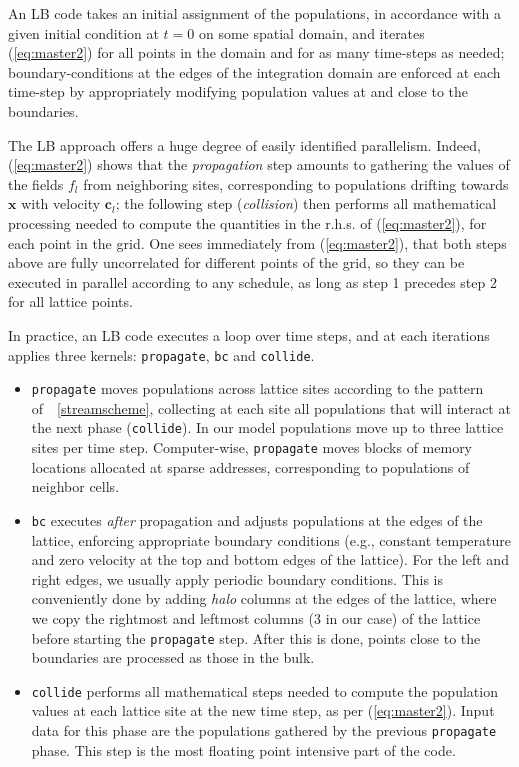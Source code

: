 \documentclass[times]{cpeauth}
\begin{document}
An LB code takes an initial assignment of the populations, in accordance
with a given initial condition at $t = 0$ on some spatial domain, and iterates
(\ref{eq:master2}) for all points in the domain and for as many time-steps
as needed; boundary-conditions at the edges of the integration
domain are enforced at each time-step by appropriately modifying population 
values at and close to the boundaries.

The LB approach offers a huge degree of easily identified parallelism. Indeed,
(\ref{eq:master2}) shows that the {\em propagation} step amounts
to gathering the values of the fields $f_l$ from neighboring sites,
corresponding to populations drifting towards ${\bm x}$ with velocity 
${\bm c}_l$; the following step ({\em collision}) then performs all mathematical
processing needed to compute the quantities in the r.h.s. of 
(\ref{eq:master2}), for each point in the grid. One sees immediately from 
(\ref{eq:master2}), that both steps above are fully
uncorrelated for different points of the grid, so they can be executed in 
parallel according to any schedule, as long as step 1 precedes step 2
for all lattice points.

In practice, an LB code executes a loop over time steps, and at each 
iterations applies three kernels: {\tt propagate}, {\tt bc} and {\tt collide}.

\begin{itemize}
\item
{\tt propagate} moves populations across lattice sites according to the
pattern of~\figurename~\ref{streamscheme}, collecting at each site
all populations that will interact at the next phase ({\tt collide}).
In our model populations move up to three lattice sites per time step.
Computer-wise, {\tt propagate} moves blocks of  memory locations allocated
at sparse addresses, corresponding to populations of neighbor cells. 

\item 
{\tt bc} executes {\em after} propagation and adjusts populations at the
edges of the lattice, enforcing appropriate boundary conditions 
(e.g., constant temperature and zero velocity at 
the top and bottom edges of the lattice).
For the left and right edges, we usually apply periodic 
boundary conditions. 
This is conveniently done by adding {\em halo} columns at the
edges of the lattice, where we copy the rightmost and leftmost 
columns (3 in our case) of the lattice before starting
the {\tt propagate} step.
After this is done, points close to the boundaries are processed 
as those in the bulk.  

\item
{\tt collide} performs all mathematical steps needed to compute the population  
values at each lattice site at the new time step, as per (\ref{eq:master2}). 
Input data for this phase are the populations gathered by the previous 
{\tt propagate} phase. This step is the most floating point intensive 
part of the code.
\end{itemize}
\end{document}
